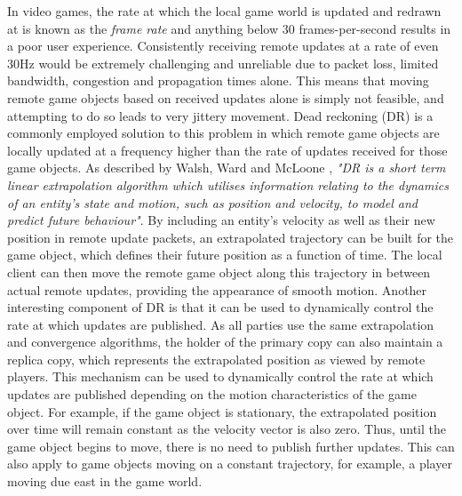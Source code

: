 In video games, the rate at which the local game world is updated and redrawn at is known as the \textit{frame rate} and anything below 30 frames-per-second results in a poor user experience. Consistently receiving remote updates at a rate of even 30Hz would be extremely challenging and unreliable due to packet loss, limited bandwidth, congestion and propagation times alone. This means that moving remote game objects based on received updates alone is simply not feasible, and attempting to do so leads to very jittery movement. Dead reckoning (DR) is a commonly employed solution to this problem in which remote game objects are locally updated at a frequency higher than the rate of updates received for those game objects. As described by Walsh, Ward and McLoone \cite{dead-reckoning}, \textit{"DR is a short term linear extrapolation algorithm which utilises information relating to the dynamics of an entity’s state and motion, such as position and velocity, to model and predict future behaviour"}. By including an entity's velocity as well as their new position in remote update packets, an extrapolated trajectory can be built for the game object, which defines their future position as a function of time. The local client can then move the remote game object along this trajectory in between actual remote updates, providing the appearance of smooth motion. Another interesting component of DR is that it can be used to dynamically control the rate at which updates are published. As all parties use the same extrapolation and convergence algorithms, the holder of the primary copy can also maintain a replica copy, which represents the extrapolated position as viewed by remote players. 
This mechanism can be used to dynamically control the rate at which updates are published depending on the motion characteristics of the game object. For example, if the game object is stationary, the extrapolated position over time will remain constant as the velocity vector is also zero. Thus, until the game object begins to move, there is no need to publish further updates. This can also apply to game objects moving on a constant trajectory, for example, a player moving due east in the game world.

